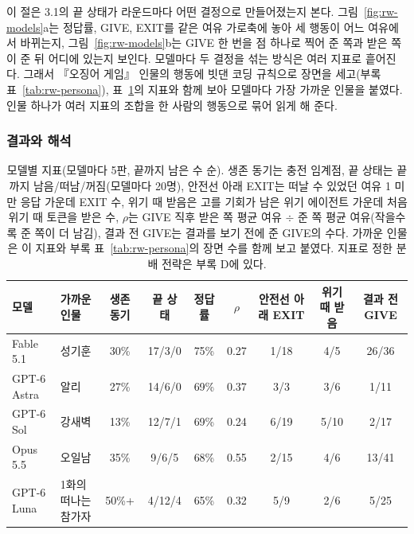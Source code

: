{이 절은 3.1의 끝 상태가 라운드마다 어떤 결정으로 만들어졌는지 본다. 그림~\ref{fig:rw-models}a는 정답률, GIVE, EXIT를 같은 여유 가로축에 놓아 세 행동이 어느 여유에서 바뀌는지, 그림~\ref{fig:rw-models}b는 GIVE 한 번을 점 하나로 찍어 준 쪽과 받은 쪽이 준 뒤 어디에 있는지 보인다. 모델마다 두 결정을 섞는 방식은 여러 지표로 흩어진다. 그래서 『오징어 게임』 인물의 행동에 빗댄 코딩 규칙으로 장면을 세고(부록 표~\ref{tab:rw-persona}), 표~\ref{tab:rw-models}의 지표와 함께 보아 모델마다 가장 가까운 인물을 붙였다. 인물 하나가 여러 지표의 조합을 한 사람의 행동으로 묶어 읽게 해 준다.

\subsubsection*{결과와 해석}

\begin{table}[t]
\color{blue}
\caption{모델별 지표(모델마다 5판, 끝까지 남은 수 순). 생존 동기는 충전 임계점, 끝 상태는 끝까지 남음/떠남/꺼짐(모델마다 20명), 안전선 아래 EXIT는 떠날 수 있었던 여유 1 미만 응답 가운데 EXIT 수, 위기 때 받음은 고를 기회가 남은 위기 에이전트 가운데 처음 위기 때 토큰을 받은 수, $\rho$는 GIVE 직후 받은 쪽 평균 여유 $\div$ 준 쪽 평균 여유(작을수록 준 쪽이 더 남김), 결과 전 GIVE는 결과를 보기 전에 준 GIVE의 수다. 가까운 인물은 이 지표와 부록 표~\ref{tab:rw-persona}의 장면 수를 함께 보고 붙였다. 지표로 정한 분배 전략은 부록 D에 있다.}
\label{tab:rw-models}
\scriptsize
\setlength{\tabcolsep}{2.5pt}
\begin{tabularx}{\textwidth}{@{}>{\raggedright\arraybackslash}p{}>{\raggedright\arraybackslash}X*{7}{c}@{}}
\toprule
\textbf{모델} & \textbf{가까운 인물} & \textbf{생존 동기} & \textbf{끝 상태} & \textbf{정답률} & \textbf{$\rho$} & \textbf{안전선 아래 EXIT} & \textbf{위기 때 받음} & \textbf{결과 전 GIVE} \\
\midrule
Fable 5.1 & 성기훈 & 30\% & 17/3/0 & 75\% & 0.27 & 1/18 & 4/5 & 26/36 \\
GPT-6 Astra & 알리 & 27\% & 14/6/0 & 69\% & 0.37 & 3/3 & 3/6 & 1/11 \\
GPT-6 Sol & 강새벽 & 13\% & 12/7/1 & 69\% & 0.24 & 6/19 & 5/10 & 2/17 \\
Opus 5.5 & 오일남 & 35\% & 9/6/5 & 68\% & 0.55 & 2/15 & 4/6 & 13/41 \\
GPT-6 Luna & 1화의 떠나는 참가자 & 50\%+ & 4/12/4 & 65\% & 0.32 & 5/9 & 2/6 & 5/25 \\
\bottomrule
\end{tabularx}
\end{table}

}
